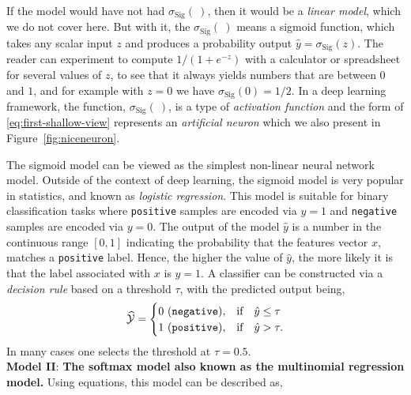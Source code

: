 \documentclass[12pt]{article}
\newcommand{\sbmc}[1]{{\color{cyan}#1}}
\begin{document}
If the model would have not had $\sigma_{\text{Sig}}(~)$, then it would be a {\em linear model}, which we do not cover here. But with it, the $\sigma_{\text{Sig}}(~)$ means a sigmoid function, which takes any scalar input $z$ and produces a probability output $\hat{y}=\sigma_{\text{Sig}}(z)$. The reader can experiment to compute $1/(1+e^{-z})$ with a calculator or spreadsheet for several values of $z$, to see that it always yields numbers that are between $0$ and $1$, and for example with $z=0$ we have $\sigma_{\text{Sig}}(0) = 1/2$. In a deep learning framework, the function, $\sigma_{\text{Sig}}(~)$, is a type of {\em activation function} and the form of \eqref{eq:first-shallow-view} represents an \textit{artificial neuron} which we also present in Figure~\ref{fig:niceneuron}. 


The sigmoid model can be viewed as the simplest non-linear neural network model. %
Outside of the context of deep learning, the sigmoid model is very popular in statistics, and known as {\em logistic regression}. This model is suitable for binary classification tasks where \texttt{positive} samples are encoded via $y=1$ and \texttt{negative} samples are encoded via $y=0$.  The output of the model $\hat{y}$ is a number in the continuous range $[0,1]$ indicating the probability that the features vector $x$, matches a \texttt{positive} label. Hence, the higher the value of $\hat{y}$, the more likely it is that the label associated with $x$ is $y=1$. A classifier can be constructed via a \textit{decision rule} based on a threshold $\tau$, with the predicted output being,
%
\begin{equation} %
\label{eq:y-hat-tau}
\widehat{\cal Y} = 
\begin{cases}
0~ (\texttt{negative}), & \text{if} \quad  \hat{y} \le \tau \\
1~ (\texttt{positive}), & \text{if} \quad   \hat{y} > \tau.
\end{cases}
\end{equation}
In many cases one selects the threshold at $\tau = 0.5$. \\

\noindent
{\bf Model II}: {\bf The softmax model also known as the multinomial regression model.} Using equations, this model can be described as,
\end{document}
